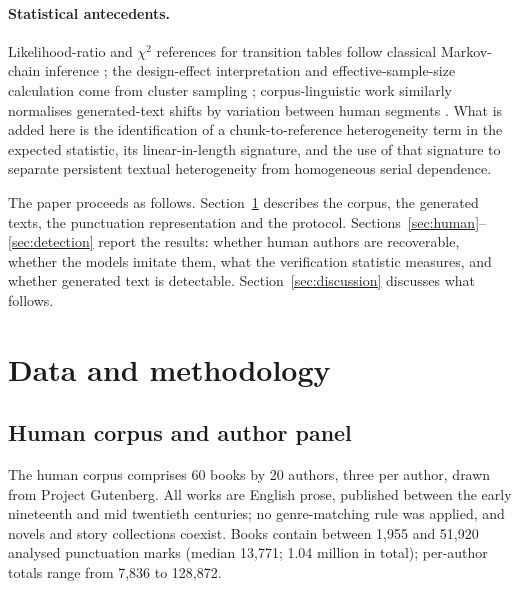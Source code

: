 \documentclass[11pt]{article}
\begin{document}
\paragraph{Statistical antecedents.}
Likelihood-ratio and \(\chi^2\) references for transition tables follow
classical Markov-chain inference \cite{anderson1957}; the design-effect
interpretation and effective-sample-size calculation come from cluster
sampling \cite{kish1965}; corpus-linguistic work similarly normalises
generated-text shifts by variation between human segments
\cite{milicka2025}.  What is added here is the identification of a
chunk-to-reference heterogeneity term in the expected statistic, its
linear-in-length signature, and the use of that signature to separate
persistent textual heterogeneity from homogeneous serial dependence.

The paper proceeds as follows.  Section~\ref{sec:materials} describes the
corpus, the generated texts, the punctuation representation and the
protocol.  Sections~\ref{sec:human}--\ref{sec:detection} report the
results: whether human authors are recoverable, whether the models imitate
them, what the verification statistic measures, and whether generated text
is detectable.  Section~\ref{sec:discussion} discusses what follows.

\section{Data and methodology}
\label{sec:materials}

\subsection{Human corpus and author panel}
\label{sec:corpus}

The human corpus comprises 60 books by 20 authors, three per author, drawn
from Project Gutenberg.  All works are English prose, published between the
early nineteenth and mid twentieth centuries; no genre-matching rule was
applied, and novels and story collections coexist.  Books contain between
1,955 and 51,920 analysed punctuation marks (median 13,771; 1.04 million in
total); per-author totals range from 7,836 to 128,872.
\end{document}
